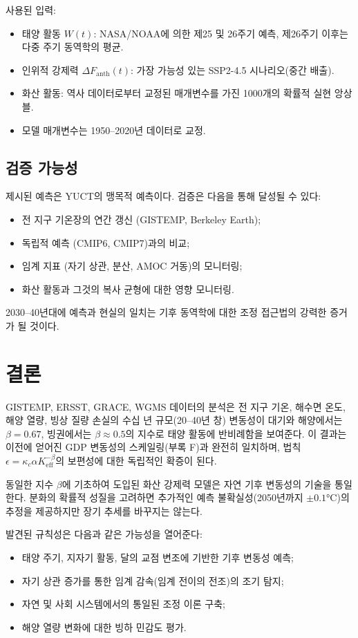 \documentclass[11pt,a4paper]{article}
\newcommand{\Keff}{K_{\mathrm{eff}}}
\newcommand{\kappac}{\kappa_c}
\newcommand{\be}{\beta}
\begin{document}
	사용된 입력:
	\begin{itemize}
		\item 태양 활동 $W(t)$: NASA/NOAA에 의한 제25 및 26주기 예측, 제26주기 이후는 다중 주기 동역학의 평균.
		\item 인위적 강제력 $\Delta F_{\mathrm{anth}}(t)$: 가장 가능성 있는 SSP2-4.5 시나리오(중간 배출).
		\item 화산 활동: 역사 데이터로부터 교정된 매개변수를 가진 1000개의 확률적 실현 앙상블.
		\item 모델 매개변수는 1950–2020년 데이터로 교정.
	\end{itemize}
	
	\subsection{검증 가능성}
	
	제시된 예측은 YUCT의 맹목적 예측이다. 검증은 다음을 통해 달성될 수 있다:
	\begin{itemize}
		\item 전 지구 기온장의 연간 갱신 (GISTEMP, Berkeley Earth);
		\item 독립적 예측 (CMIP6, CMIP7)과의 비교;
		\item 임계 지표 (자기 상관, 분산, AMOC 거동)의 모니터링;
		\item 화산 활동과 그것의 복사 균형에 대한 영향 모니터링.
	\end{itemize}
	2030–40년대에 예측과 현실의 일치는 기후 동역학에 대한 조정 접근법의 강력한 증거가 될 것이다.
	
	\section{결론}
	
	GISTEMP, ERSST, GRACE, WGMS 데이터의 분석은 전 지구 기온, 해수면 온도, 해양 열량, 빙상 질량 손실의 수십 년 규모(20–40년 창) 변동성이 대기와 해양에서는 $\be = 0.67$, 빙권에서는 $\be \approx 0.5$의 지수로 태양 활동에 반비례함을 보여준다. 이 결과는 이전에 얻어진 GDP 변동성의 스케일링(부록 F)과 완전히 일치하며, 법칙 $\epsilon = \kappac \alpha \Keff^{-\be}$의 보편성에 대한 독립적인 확증이 된다.
	
	동일한 지수 $\beta$에 기초하여 도입된 화산 강제력 모델은 자연 기후 변동성의 기술을 통일한다. 분화의 확률적 성질을 고려하면 추가적인 예측 불확실성(2050년까지 $\pm0.1$°C)의 추정을 제공하지만 장기 추세를 바꾸지는 않는다.
	
	발견된 규칙성은 다음과 같은 가능성을 열어준다:
	\begin{itemize}
		\item 태양 주기, 지자기 활동, 달의 교점 변조에 기반한 기후 변동성 예측;
		\item 자기 상관 증가를 통한 임계 감속(임계 전이의 전조)의 조기 탐지;
		\item 자연 및 사회 시스템에서의 통일된 조정 이론 구축;
		\item 해양 열량 변화에 대한 빙하 민감도 평가.
	\end{itemize}
	
\end{document}
